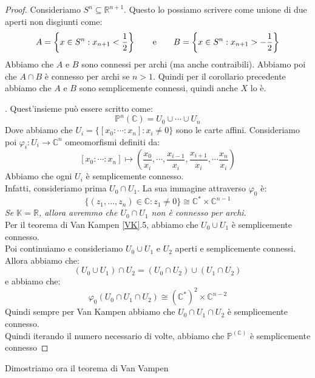 \documentclass[11pt,a4paper,twoside]{article}
\theoremstyle{definition}
\begin{document}
\begin{proof}
	 Consideriamo $S^n \subseteq \mathbb R^{n+1}$. Questo lo possiamo scrivere come unione di due aperti non disgiunti come:
	\[ A = \left\{x \in S^n: x_{n+1}<\frac 12\right\}\qquad \text e \qquad B = \left\{ x \in S^n: x_{n+1}>-\frac 12 \right\} \]
	Abbiamo che $A$ e $B$ sono connessi per archi (ma anche contraibili). Abbiamo poi che $A\cap B$ è connesso per archi se $n>1$. Quindi per il corollario precedente abbiamo che $A$ e $B$ sono semplicemente connessi, quindi anche $X$ lo è.

	. Quest'insieme può essere scritto come:
	\[ \mathbb P^n(\mathbb C) = U_0\cup \cdots \cup U_n\]
	Dove abbiamo che $U_i = \{[x_0:\cdots:x_n]: x_i \neq 0\}$ sono le carte affini. Consideriamo poi $\varphi_i:U_i \to \mathbb C^n$ omeomorfismi definiti da:
	\[ [x_0:\cdots :x_n] \mapsto \left(\frac {x_0}{x_i}, \cdots, \frac{x_{i-1}}{x_i}, \frac{x_{i+1}}{x_i}, \cdots \frac {x_n}{x_i}\right) \]
	Abbiamo che ogni $U_i$ è semplicemente connesso.\\
	Infatti, consideriamo prima $U_0 \cap U_1$. La sua immagine attraverso $\varphi_0$ è:
	\[ \{(z_1,...,z_n) \in \mathbb C: z_1 \neq 0\} \cong \mathbb C^* \times \mathbb C^{n-1} \]
	\textit{Se $\mathbb K = \mathbb R$, allora avremmo che $U_0\cap U_1$ non è connesso per archi}.\\
	Per il teorema di Van Kampen \ref{VK}.5, abbiamo che $U_0 \cup U_1$ è semplicemente connesso.\\
	Poi continuiamo e consideriamo $U_0\cup U_1$ e $U_2$ aperti e semplicemente connessi. Allora abbiamo che:
	\[ (U_0 \cup U_1) \cap U_2 = (U_0 \cap U_2)\cup (U_1 \cap U_2) \]
	e abbiamo che:
	\[ \varphi_0(U_0\cap U_1 \cap U_2) \cong (\mathbb C^*)^2 \times \mathbb C^{n-2} \]
	Quindi sempre per Van Kampen abbiamo che $U_0 \cap U_1 \cap U_2$ è semplicemente connesso.\\
	Quindi iterando il numero necessario di volte, abbiamo che $\mathbb P^(\mathbb C)$ è semplicemente connesso
\end{proof}

Dimostriamo ora il teorema di Van Vampen
\end{document}
